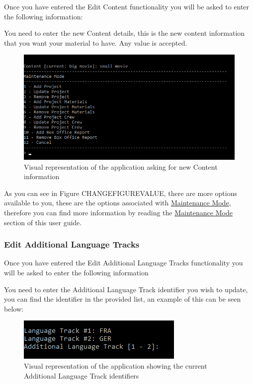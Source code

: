 \documentclass[
  english,
  a4paper,
,tablecaptionabove
]{scrartcl}
\begin{document}
Once you have entered the Edit Content functionality you will be asked
to enter the following information:

You need to enter the new Content details, this is the new content
information that you want your material to have. Any value is accepted.

\begin{figure}
\centering
\includegraphics{images/user-guide/maintenance-mode/update-project-material-content.png}
\caption{Visual representation of the application asking for new Content
information}
\end{figure}

As you can see in Figure CHANGEFIGUREVALUE, there are more options
available to you, these are the options associated with
\protect\hyperlink{using-maintenance-mode}{Maintenance Mode}, therefore
you can find more information by reading the
\protect\hyperlink{using-maintenance-mode}{Maintenance Mode} section of
this user guide.

\newpage

\hypertarget{edit-additional-language-tracks-1}{%
\subsubsection{Edit Additional Language
Tracks}\label{edit-additional-language-tracks-1}}

Once you have entered the Edit Additional Language Tracks functionality
you will be asked to enter the following information

You need to enter the Additional Language Track identifier you wish to
update, you can find the identifier in the provided list, an example of
this can be seen below:

\begin{figure}
\centering
\includegraphics{images/user-guide/maintenance-mode/update-project-material-additional-language-track-select-id.png}
\caption{Visual representation of the application showing the current
Additional Language Track identifiers}
\end{figure}
\end{document}
